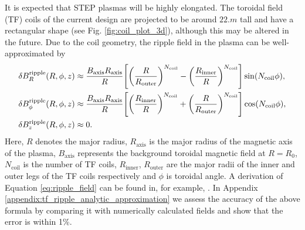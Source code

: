 \documentclass[10pt, a4paper, twoside]{article}
\begin{document}
It is expected that STEP plasmas will be highly elongated. The toroidal field (TF) coils of the current design are projected to be around $\si{22.m}$ tall and have a rectangular shape (see Fig. \ref{fig:coil_plot_3d}), although this may be altered in the future. Due to the coil geometry, the ripple field in the plasma can be well-approximated by
\begin{equation}
    \label{eq:ripple_field}
    \begin{aligned}
        \delta B_R^{\text{ripple}}(R, \phi, z) &\approx \frac{B_\text{axis} R_\text{axis}}{R}\qty[\qty(\frac{R}{R_{\text{outer}}})^{N_\text{coil}}-\qty(\frac{R_\text{inner}}{R})^{N_\text{coil}}]\sin(N_{\text{coil}}\phi), \\
        \delta B_\phi^{\text{ripple}}(R, \phi, z) &\approx \frac{B_\text{axis} R_\text{axis}}{R}\qty[\qty(\frac{R_\text{inner}}{R})^{N_\text{coil}} + \qty(\frac{R}{R_{\text{outer}}})^{N_\text{coil}}]\cos(N_{\text{coil}}\phi),\\
        \delta B_z^{\text{ripple}}(R, \phi, z) &\approx 0.
    \end{aligned}
\end{equation}
Here, $R$ denotes the major radius, $R_\text{axis}$ is the major radius of the magnetic axis of the plasma, $B_\text{axis}$ represents the background toroidal magnetic field at $R=R_0$, $N_{\text{coil}}$ is the number of TF coils, $R_\text{inner}$, $R_\text{outer}$ are the major radii of the inner and outer legs of the TF coils respectively and $\phi$ is toroidal angle. A derivation of Equation \eqref{eq:ripple_field} can be found in, for example, \cite{mcclements2005}. In Appendix \ref{appendix:tf_ripple_analytic_approximation} we assess the accuracy of the above formula by comparing it with numerically calculated fields and show that the error is within 1\%.
\end{document}
